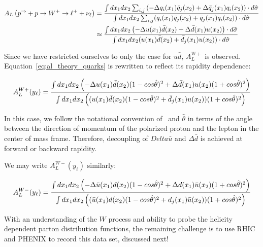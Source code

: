 \begin{align}\label{eq:al_theory_quarks}
  {
    A_L
    \left(
      p^{\Rightarrow}+p\rightarrow W^+ \rightarrow \ell^+ +\nu_{\ell}
    \right)
  } &=  
  {
    {
      \int dx_1 dx_2 \sum_{i,j}
      \left(
        -\Delta q_i(x_1)\bar{q}_j(x_2)
        +\Delta \bar{q}_j(x_1)q_i(x_2)
      \right)\cdot d \hat{\sigma}
    }
    \over
    {
      \int dx_1 dx_2
      \sum_{i,j}(q_i(x_1)\bar{q}_j(x_2)+\bar{q}_j(x_1)q_i(x_2))\cdot d\hat{\sigma}
    }
 }\\
 & \approx  \nonumber
 {
   {
      \int dx_1 dx_2 
      \left(
        -\Delta u(x_1)\bar{d}(x_2)
        +\Delta \bar{d}(x_1)u(x_2)
      \right)\cdot d \hat{\sigma}
   }
   \over
   {
      \int dx_1 dx_2 (u(x_1)\bar{d}(x_2)+\bar{d}_j(x_1)u(x_2))\cdot d\hat{\sigma}
   }
 }
\end{align}

{\noindent}Since we have restricted ourselves to only the case for $u\bar{d}$,
$A_L^{W+}$ is observed. Equation~\ref{eq:al_theory_quarks} is rewritten to
reflect its rapidity dependence:

\begin{equation}
  {A_L^{W+}(y_{\ell})} = 
  {
    {
     \int dx_1 dx_2 
     \left(
       -\Delta u(x_1)\bar{d}(x_2)(1-cos\hat{\theta})^2
       +\Delta \bar{d}(x_1)u(x_2)(1+cos\hat{\theta})^2
     \right)
    }
    \over
    {
       \int dx_1 dx_2 
       \left(
       (u(x_1)\bar{d}(x_2)   (1-cos\hat{\theta})^2
      +\bar{d}_j(x_1)u(x_2)) (1+cos\hat{\theta})^2
        \right)
    }
  }
  \label{eq:al_w_pos_rapidity_dependance}
\end{equation}

{\noindent}In this case, we follow the notational convention of~\cite{Oide2012}
and $\hat{\theta}$ in terms of the angle between the direction of momentum of
the polarized proton and the lepton in the center of mass frame. Therefore,
decoupling of $Delta\bar{u}$ and $\Delta\bar{d}$ is achieved at forward or
backward rapidity.

{\noindent}We may write $A_L^{W-}(y_{\ell})$ similarly:

\begin{equation}
  {A_L^{W-}(y_{\ell})} = 
  {
    {
     \int dx_1 dx_2 
     \left(
       -\Delta \bar{u}(x_1)d(x_2)(1-cos\hat{\theta})^2
       +\Delta d(x_1)\bar{u}(x_2)(1+cos\hat{\theta})^2
     \right)
    }
    \over
    {
       \int dx_1 dx_2 
       \left(
         (\bar{u}(x_1)d(x_2)   (1-cos\hat{\theta})^2
         +d_j(x_1)\bar{u}(x_2)) (1+cos\hat{\theta})^2
        \right)
    }
  }
  \label{eq:al_w_neg_rapidity_dependance}
\end{equation}
\clearpage

With an understanding of the $W$ process and ability to probe the helicity
dependent parton distribution functions, the remaining challenge is to use RHIC
and PHENIX to record this data set, discussed next!

